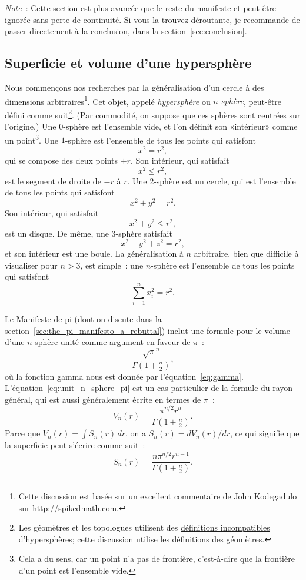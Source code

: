 \emph{Note}~: Cette section est plus avancée que le reste du manifeste et peut
être ignorée sans perte de continuité. Si vous la trouvez déroutante, je
recommande de passer directement à la conclusion, dans la
section~\ref{sec:conclusion}.

  \subsection{Superficie et volume d'une hypersphère} %
  \label{sec:volume_of_a_hypersphere}

Nous commençons nos recherches par la généralisation d'un cercle à des
dimensions arbitraires\ns\footnote{Cette discussion est basée sur un excellent
commentaire de John Kodegadulo sur \url{http://spikedmath.com}.}. Cet objet,
appelé \emph{hypersphère} ou \emph{$n$-sphère}, peut-être défini comme
suit\ns\footnote{Les géomètres et les topologues utilisent des
\href{https://translate.google.com/translate?sl=en&tl=fr&u=https://mathworld.wolfram.com/Hypersphere.html}{définitions
incompatibles d'hypersphères}\ns; cette discussion utilise les définitions des
géomètres.}. (Par commodité, on suppose que ces sphères sont centrées sur
l'origine.) Une $0$-sphère est l'ensemble vide, et l'on définit son
«\ns intérieur\ns » comme un point\ns\footnote{Cela a du sens, car un point n'a pas
de frontière, c'est-à-dire que la frontière d'un point est l'ensemble vide.}.
Une $1$-sphère est l'ensemble de tous les points qui satisfont
\[
x^2 = r^2,
\]
qui se compose des deux points $\pm r$. Son intérieur, qui satisfait
\[
x^2 \leq r^2,
\]
est le segment de droite de $-r$ à $r$. Une $2$-sphère est un cercle, qui est
l'ensemble de tous les points qui satisfont
\[
x^2 + y^2 = r^2.
\]
Son intérieur, qui satisfait
\[
x^2 + y^2 \leq r^2,
\]
est un disque. De même, une $3$-sphère satisfait
\[
x^2 + y^2 + z^2 = r^2,
\]
et son intérieur est une boule. La généralisation à $n$ arbitraire, bien que
difficile à visualiser pour $n > 3$, est simple~: une $n$-sphère est l'ensemble
de tous les points qui satisfont
\[
\sum_{i=1}^{n} x_i^2 = r^2.
\]

Le Manifeste de pi (dont on discute dans la
section~\ref{sec:the_pi_manifesto_a_rebuttal}) inclut une formule pour le volume
d'une $n$-sphère unité comme argument en faveur de $\pi$~:
\begin{equation}
\label{eq:unit_n_sphere_pi}
\frac{\sqrt{\pi}^{n} }{\Gamma(1 + \frac{n}{2})},
\end{equation}
où la fonction gamma nous est donnée par l'équation~\eqref{eq:gamma}.
L'équation~\eqref{eq:unit_n_sphere_pi} est un cas particulier de la formule du
rayon général, qui est aussi généralement écrite en termes de $\pi$~:
\begin{equation}
\label{eq:n_sphere_pi}
V_n(r) = \frac{\pi^{n/2} r^n}{\Gamma(1 + \frac{n}{2})}.
\end{equation}
Parce que $V_n(r) = \int S_n(r)\,dr$, on a $S_n(r) = dV_n(r)/dr$, ce qui
signifie que la superficie peut s'écrire comme suit~:
\begin{equation}
\label{eq:n_sphere_pi_r}
S_n(r) = \frac{n \pi^{n/2} r^{n-1}}{\Gamma(1 + \frac{n}{2})}.
\end{equation}


